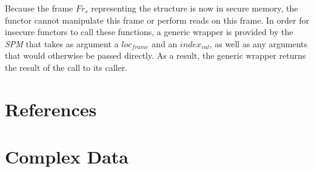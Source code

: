 \documentclass[10pt,a4paper,master=cws, masteroption=ai,english,inputenc=utf8]{kulemt}
\begin{document}
\begin{description}
Because the frame $Fr_{s}$ representing the structure is now in secure memory, the functor cannot manipulate this frame or perform reads on this frame.
In order for insecure functors to call these functions, a generic wrapper is provided by the \emph{SPM} that takes as argument a $loc_{frame}$ and an $index_{val}$, as well as any arguments that would otherwise be passed directly.
As a result, the generic wrapper returns the result of the call to its caller.
\end{description}


\chapter{References\label{chap:References}\label{test}}
\chapter{Complex Data\label{chap:ComplexData}}




\end{document}
